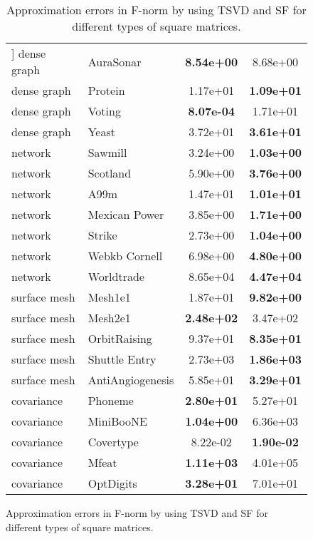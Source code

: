 \documentclass{article}
\begin{document}
\begin{figure}[t]
\begin{center}
\setlength\tabcolsep{3pt}
\begin{table}[t]
\caption{Approximation errors in F-norm by using TSVD and SF for different types of square matrices.}
\label{tab:othermats}
\begin{center}
\begin{tabular}{llcc}
\hline\hline\-3mm]
 dense graph &        AuraSonar &   \bf{8.54e+00} &        8.68e+00 \\
 dense graph &          Protein &        1.17e+01 &   \bf{1.09e+01} \\
 dense graph &           Voting &   \bf{8.07e-04} &        1.71e+01 \\
 dense graph &            Yeast &        3.72e+01 &   \bf{3.61e+01} \\
     network &          Sawmill &        3.24e+00 &   \bf{1.03e+00} \\
     network &         Scotland &        5.90e+00 &   \bf{3.76e+00} \\
     network &             A99m &        1.47e+01 &   \bf{1.01e+01} \\
     network &    Mexican Power &        3.85e+00 &   \bf{1.71e+00} \\
     network &           Strike &        2.73e+00 &   \bf{1.04e+00} \\
     network &    Webkb Cornell &        6.98e+00 &   \bf{4.80e+00} \\
     network &       Worldtrade &        8.65e+04 &   \bf{4.47e+04} \\
surface mesh &          Mesh1e1 &        1.87e+01 &   \bf{9.82e+00} \\
surface mesh &          Mesh2e1 &   \bf{2.48e+02} &        3.47e+02 \\
surface mesh &     OrbitRaising &        9.37e+01 &   \bf{8.35e+01} \\
surface mesh &    Shuttle Entry &        2.73e+03 &   \bf{1.86e+03} \\
surface mesh & AntiAngiogenesis &        5.85e+01 &   \bf{3.29e+01} \\
  covariance &          Phoneme &   \bf{2.80e+01} &        5.27e+01 \\
  covariance &        MiniBooNE &   \bf{1.04e+00} &        6.36e+03 \\
  covariance &        Covertype &        8.22e-02 &   \bf{1.90e-02} \\
  covariance &            Mfeat &   \bf{1.11e+03} &        4.01e+05 \\
  covariance &        OptDigits &   \bf{3.28e+01} &        7.01e+01 \\

\end{tabular}
\end{center}
\end{table}
\end{center}
\end{figure}
\end{document}
